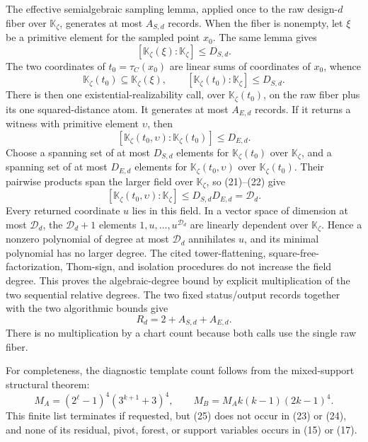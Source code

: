 The effective semialgebraic sampling lemma, applied once to the raw design-\(d\) fiber over \(\mathbb K_{\zeta}\), generates at most \(A_{S,d}\) records.  When the fiber is nonempty, let \(\xi\) be a primitive element for the sampled point \(x_0\).  The same lemma gives
\[
[\mathbb K_{\zeta}(\xi):\mathbb K_{\zeta}]
\leq D_{S,d}.                                                \tag{20}
\]
The two coordinates of \(t_0=\tau_C(x_0)\) are linear sums of coordinates of \(x_0\), whence
\[
\mathbb K_{\zeta}(t_0)\subseteq\mathbb K_{\zeta}(\xi),
\qquad
[\mathbb K_{\zeta}(t_0):\mathbb K_{\zeta}]
\leq D_{S,d}.                                                \tag{21}
\]
There is then one existential-realizability call, over \(\mathbb K_{\zeta}(t_0)\), on the raw fiber plus its one squared-distance atom.  It generates at most \(A_{E,d}\) records.  If it returns a witness with primitive element \(\upsilon\), then
\[
[\mathbb K_{\zeta}(t_0,\upsilon):
  \mathbb K_{\zeta}(t_0)]\leq D_{E,d}.                      \tag{22}
\]
Choose a spanning set of at most \(D_{S,d}\) elements for \(\mathbb K_{\zeta}(t_0)\) over \(\mathbb K_{\zeta}\), and a spanning set of at most \(D_{E,d}\) elements for \(\mathbb K_{\zeta}(t_0,\upsilon)\) over \(\mathbb K_{\zeta}(t_0)\).  Their pairwise products span the larger field over \(\mathbb K_{\zeta}\), so (21)--(22) give
\[
[\mathbb K_{\zeta}(t_0,\upsilon):\mathbb K_{\zeta}]
\leq D_{S,d}D_{E,d}=\mathcal D_d.                           \tag{23}
\]
Every returned coordinate \(u\) lies in this field.  In a vector space of dimension at most \(\mathcal D_d\), the \(\mathcal D_d+1\) elements \(1,u,\ldots,u^{\mathcal D_d}\) are linearly dependent over \(\mathbb K_{\zeta}\).  Hence a nonzero polynomial of degree at most \(\mathcal D_d\) annihilates \(u\), and its minimal polynomial has no larger degree.  The cited tower-flattening, square-free-factorization, Thom-sign, and isolation procedures do not increase the field degree.  This proves the algebraic-degree bound by explicit multiplication of the two sequential relative degrees.  The two fixed status/output records together with the two algorithmic bounds give
\[
R_d=2+A_{S,d}+A_{E,d}.                                      \tag{24}
\]
There is no multiplication by a chart count because both calls use the single raw fiber.

For completeness, the diagnostic template count follows from the mixed-support structural theorem:
\[
M_A=(2^{\ell}-1)^4(3^{k+1}+3)^4,
\qquad
M_B=M_Ak(k-1)(2k-1)^4.                                     \tag{25}
\]
This finite list terminates if requested, but (25) does not occur in (23) or (24), and none of its residual, pivot, forest, or support variables occurs in (15) or (17).

